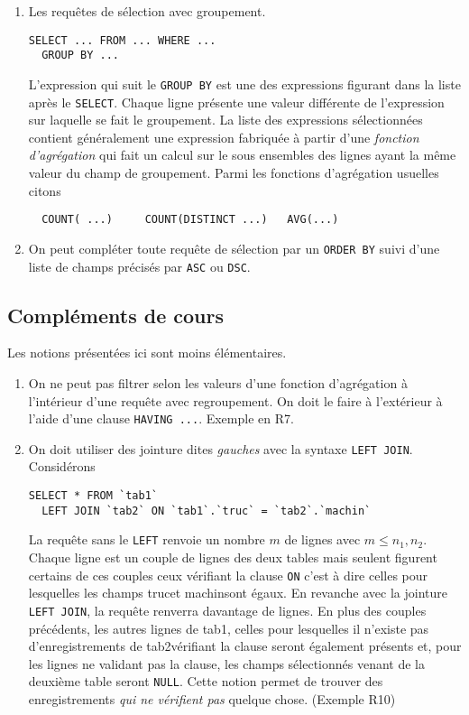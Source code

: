 \begin{enumerate}
\item Les requêtes de sélection avec groupement.
\begin{verbatim}
SELECT ... FROM ... WHERE ...
  GROUP BY ...
\end{verbatim}
L'expression qui suit le \texttt{GROUP BY} est une des expressions figurant dans la liste après le \texttt{SELECT}. Chaque ligne présente une valeur différente de l'expression sur laquelle se fait le groupement. La liste des expressions sélectionnées contient généralement une expression fabriquée à partir d'une \emph{fonction d'agrégation} qui fait un calcul sur le sous ensembles des lignes ayant la même valeur du champ de groupement. Parmi les fonctions d'agrégation usuelles citons
\begin{verbatim}
  COUNT( ...)     COUNT(DISTINCT ...)   AVG(...)    
\end{verbatim}

\item On peut compléter toute requête de sélection par un \texttt{ORDER BY} suivi d'une liste de champs précisés par \texttt{ASC} ou \texttt{DSC}.

\end{enumerate}


\subsection*{Compléments de cours}
Les notions présentées ici sont moins élémentaires.
\begin{enumerate}
  \item On ne peut pas filtrer selon les valeurs d'une fonction d'agrégation à l'intérieur d'une requête avec regroupement.\newline
On doit le faire à l'extérieur à l'aide d'une clause \texttt{HAVING ...}. Exemple en R7.
  \item On doit utiliser des jointure dites \emph{gauches} avec la syntaxe \texttt{LEFT JOIN}. Considérons 
\begin{verbatim}
SELECT * FROM `tab1` 
  LEFT JOIN `tab2` ON `tab1`.`truc` = `tab2`.`machin` 
\end{verbatim}
La requête sans le \texttt{LEFT} renvoie un nombre $m$ de lignes avec $m\leq n_1,n_2$. Chaque ligne est un couple de lignes des deux tables mais seulent figurent certains de ces couples ceux vérifiant la clause  \texttt{ON} c'est à dire celles pour lesquelles les champs \og truc\fg et \og machin\fg sont égaux.\newline
En revanche avec la jointure \texttt{LEFT JOIN}, la requête renverra davantage de lignes. En plus des couples précédents, les autres lignes de \og tab1\fg, celles pour lesquelles il n'existe pas d'enregistrements de \og tab2\fg vérifiant la clause seront également présents et, pour les lignes ne validant pas la clause, les champs sélectionnés venant de la deuxième table seront \texttt{NULL}. Cette notion permet de trouver des enregistrements \emph{qui ne vérifient pas} quelque chose. (Exemple R10) 
\end{enumerate}

